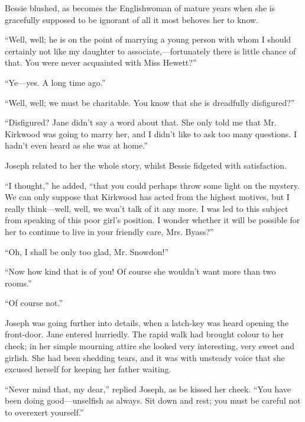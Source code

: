 Bessie blushed, as becomes the Englishwoman of mature years when she is
gracefully supposed to be ignorant of all it most behoves her to know.

``Well, well; he is on the point of marrying a young person with whom I
should certainly not like my daughter to associate,---fortunately there
is little chance of that. You were never acquainted with Miss Hewett?''

``Ye---yes. A long time ago.''

``Well, well; we must be charitable. You know that she is dreadfully
disfigured?''

``Disfigured? Jane didn't say a word about that. She only told me that
Mr. Kirkwood was going to marry her, and I didn't like to ask too many
questions. I hadn't even heard as she was at home.''

Joseph related to her the whole story, whilst Bessie fidgeted with
satisfaction.

``I thought,'' he added, ``that you could
{\protect\hypertarget{226}{}{}}perhaps throw some light on the mystery.
We can only suppose that Kirkwood has acted from the highest motives,
but I really think---well, well, we won't talk of it any more. I was led
to this subject from speaking of this poor girl's position. I wonder
whether it will be possible for her to continue to live in your friendly
care, Mrs. Byass?''

``Oh, I shall be only too glad, Mr. Snowdon!''

``Now how kind that is of you! Of course she wouldn't want more than two
rooms.''

``Of course not.''

Joseph was going further into details, when a latch-key was heard
opening the front-door. Jane entered hurriedly. The rapid walk had
brought colour to her cheek; in her simple mourning attire she looked
very interesting, very sweet and girlish. She had been shedding tears,
and it was with unsteady voice that she excused herself for keeping her
father waiting.

``Never mind that, my dear,'' replied Joseph, as be kissed her cheek.
``You have been doing good---unselfish as always. Sit down and rest; you
must be careful not to overexert yourself.''


